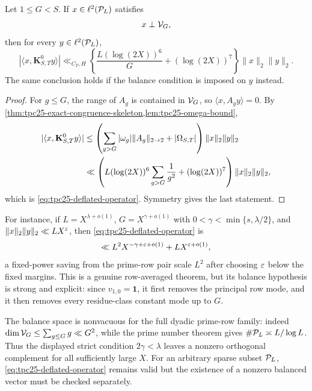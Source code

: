 \begin{theorem}
\label{thm:tpc25-deflated-operator}
Let \(1\le G<S\).  If \(x\in\ell^2(\mathcal P_L)\) satisfies
\begin{equation}
 x\perp\mathcal V_G,
 \label{eq:tpc25-exact-row-balance}
\end{equation}
then for every \(y\in\ell^2(\mathcal P_L)\),
\begin{equation}
 \boxed{
 |\langle x,\mathbf K^0_{S,T}y\rangle|
 \ll_{C_T,H}
 \left\{
 \frac{L(\log(2X))^6}{G}
 +(\log(2X))^7
 \right\}\|x\|_2\|y\|_2.}
 \label{eq:tpc25-deflated-operator}
\end{equation}
The same conclusion holds if the balance condition is imposed on
\(y\) instead.
\end{theorem}

\begin{proof}
For \(g\le G\), the range of \(A_g\) is contained in \(\mathcal V_G\), so
\(\langle x,A_gy\rangle=0\).  By
\cref{thm:tpc25-exact-congruence-skeleton,lem:tpc25-omega-bound},
\begin{align*}
 |\langle x,\mathbf K^0_{S,T}y\rangle|
 &\le
 \left(
 \sum_{g>G}|\omega_g|\|A_g\|_{2\to2}
 +|\Omega_{S,T}|
 \right)\|x\|_2\|y\|_2\notag\\
 &\ll
 \left(
 L(\log(2X))^6\sum_{g>G}\frac1{g^2}
 +(\log(2X))^7
 \right)\|x\|_2\|y\|_2,
\end{align*}
which is \eqref{eq:tpc25-deflated-operator}.  Symmetry gives the last
statement.
\end{proof}

For instance, if \(L=X^{\lambda+o(1)}\),
\(G=X^{\gamma+o(1)}\) with \(0<\gamma<\min\{s,\lambda/2\}\), and
\(\|x\|_2\|y\|_2\ll LX^\varepsilon\), then
\eqref{eq:tpc25-deflated-operator} is
\begin{equation}
 \ll L^2X^{-\gamma+\varepsilon+o(1)}
   +LX^{\varepsilon+o(1)},
 \label{eq:tpc25-deflated-power-saving}
\end{equation}
a fixed-power saving from the prime-row pair scale \(L^2\) after
choosing \(\varepsilon\) below the fixed margins.  This is a genuine
row-averaged theorem, but its balance hypothesis is strong and
explicit: since \(v_{1,0}=\mathbf1\), it first removes the principal
row mode, and it then removes every residue-class constant mode up to
\(G\).

The balance space is nonvacuous for the full dyadic prime-row family:
indeed \(\dim\mathcal V_G\le\sum_{g\le G}g\ll G^2\), while the prime number
theorem gives \(\#\mathcal P_L\asymp L/\log L\).  Thus the displayed strict
condition \(2\gamma<\lambda\) leaves a nonzero orthogonal complement
for all sufficiently large \(X\).  For an arbitrary sparse subset
\(\mathcal P_L\), \eqref{eq:tpc25-deflated-operator} remains valid but the
existence of a nonzero balanced vector must be checked separately.


